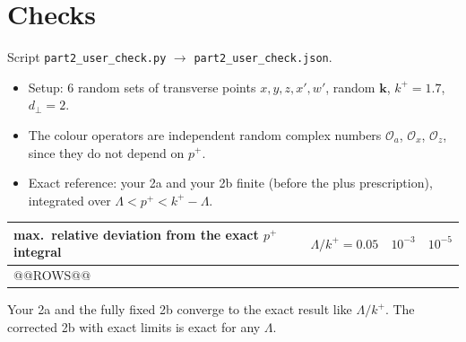 \documentclass[10pt]{article}
\numberwithin{equation}{section}
\newcommand{\Ox}{\mathcal O_x}
\newcommand{\Oz}{\mathcal O_z}
\begin{document}
\section{Checks}\label{sec:checks}
Script \texttt{part2\_user\_check.py} $\to$ \texttt{part2\_user\_check.json}.
\begin{itemize}
\item Setup: 6 random sets of transverse points $x,y,z,x',w'$, random $\mathbf k$, $k^+=1.7$, $d_\perp=2$.
\item The colour operators are independent random complex numbers $\mathcal O_a$, $\Ox$, $\Oz$, since they do not depend on $p^+$.
\item Exact reference: your 2a and your 2b finite (before the plus prescription), integrated over $\Lambda<p^+<k^+-\Lambda$.
\end{itemize}
\begin{center}\small
\begin{tabular}{@{}lccc@{}}\toprule
max.\ relative deviation from the exact $p^+$ integral & $\Lambda/k^+=0.05$ & $10^{-3}$ & $10^{-5}$\\\midrule
@@ROWS@@
\bottomrule
\end{tabular}
\end{center}
Your 2a and the fully fixed 2b converge to the exact result like $\Lambda/k^+$. The corrected 2b with exact limits is exact for any $\Lambda$.
\end{document}
